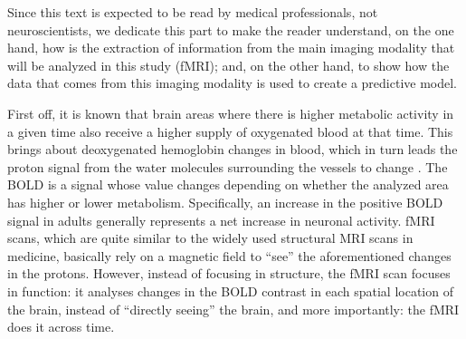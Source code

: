\documentclass[a4paper,12pt]{elsarticle}  %
\begin{document}
Since this text is expected to be read by medical professionals, not neuroscientists, we dedicate this part to make the reader understand, on the one hand, how is the extraction of information from the main imaging modality that will be analyzed in this study (fMRI); and, on the other hand, to show how the data that comes from this imaging modality is used to create a predictive model.

First off, it is known that brain areas where there is higher metabolic activity in a given time also receive a higher supply of oxygenated blood at that time. This brings about deoxygenated hemoglobin changes in blood, which in turn leads the proton signal from the water molecules surrounding the vessels to change \cite{nature_Chou}. The BOLD is a signal whose value changes depending on whether the analyzed area has higher or lower metabolism. Specifically, an increase in the positive BOLD signal in adults generally represents a net increase in neuronal activity\cite{Hall2016}. fMRI scans, which are quite similar to the widely used structural MRI scans in medicine, basically rely on a magnetic field to ``see'' the aforementioned changes in the protons. However, instead of focusing in structure, the fMRI scan focuses in function: it analyses changes in the BOLD contrast in each spatial location of the brain, instead of ``directly seeing'' the brain, and more importantly: the fMRI does it across time.
\end{document}

